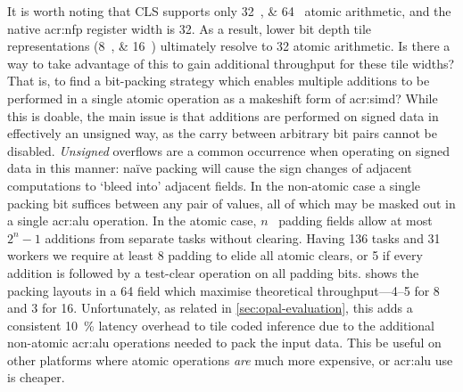 It is worth noting that CLS supports only \qtylist{32;64}{\bit} atomic arithmetic, and the native \gls{acr:nfp} register width is \qty{32}{\bit}.
As a result, lower bit depth tile representations (\qtylist{8;16}{\bit}) ultimately resolve to \qty{32}{\bit} atomic arithmetic.
Is there a way to take advantage of this to gain additional throughput for these tile widths?
That is, to find a bit-packing strategy which enables multiple additions to be performed in a single atomic operation as a makeshift form of \gls{acr:simd}?
While this is doable, the main issue is that additions are performed on signed data in effectively an unsigned way, as the carry between arbitrary bit pairs cannot be disabled.
\emph{Unsigned} overflows are a common occurrence when operating on signed data in this manner: na\"{i}ve packing will cause the sign changes of adjacent computations to `bleed into' adjacent fields.
In the non-atomic case a single packing bit suffices between any pair of values, all of which may be masked out in a single \gls{acr:alu} operation.
In the atomic case, $n$~\unit{\bit} padding fields allow at most $2^n-1$ additions from separate tasks without clearing.
Having \num{136} tasks and \num{31} workers we require at least \qty{8}{\bit} padding to elide all atomic clears, or \qty{5}{\bit} if every addition is followed by a test-clear operation on all padding bits.
 shows the packing layouts in a \qty{64}{\bit} field which maximise theoretical throughput---\qtyrange{4}{5}{\times} for \qty{8}{\bit} and \qty{3}{\times} for \qty{16}{\bit}.
Unfortunately, as related in \cref{sec:opal-evaluation}, this adds a consistent \qty{10}{\percent} latency overhead to tile coded inference due to the additional non-atomic \gls{acr:alu} operations needed to pack the input data.
This be useful on other platforms where atomic operations \emph{are} much more expensive, or \gls{acr:alu} use is cheaper.

